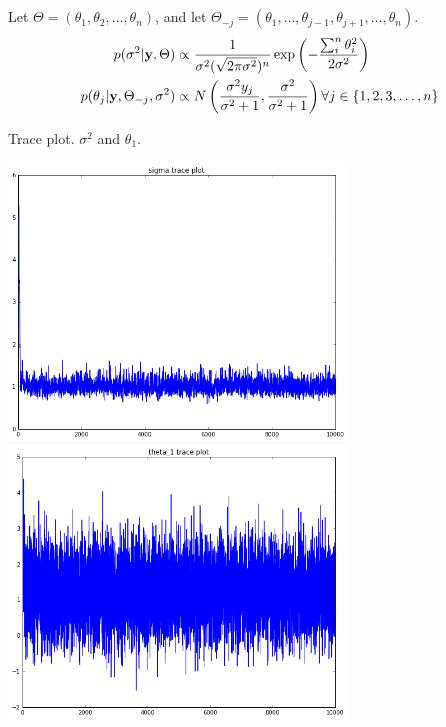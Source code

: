 \documentclass{article}
\begin{document}
	\subsection{}
	Let $\Theta = (\theta_1, \theta_2, \dots , \theta_n)$, and let $\Theta_{-j} = (\theta_1, \dots, \theta_{j-1}, \theta_{j+1}, \dots, \theta_n)$.
		\begin{align*}
			p(\sigma^2 | {\bf y}, \Theta) &\propto \frac{1}{\sigma^2(\sqrt{2\pi \sigma^2})^n} \exp\left( -\frac{\sum_i^n \theta_i^2}{2\sigma^2}\right) \\
			p(\theta_j | {\bf y}, \Theta_{-j}, \sigma^2) &\propto N \left( \frac{\sigma^2 y_j}{\sigma^2 + 1}, \frac{\sigma^2}{\sigma^2 + 1}\right) \forall j \in \left\{1, 2, 3, \dots, n \right\} \\
		\end{align*}
		
		Trace plot. $\sigma^2$ and $\theta_1$.
		\par
		\includegraphics[width = 9cm]{1-c-sigma.png}
		\includegraphics[width = 9cm]{1-c-theta.png}
		
	
\section{}
\end{document}
